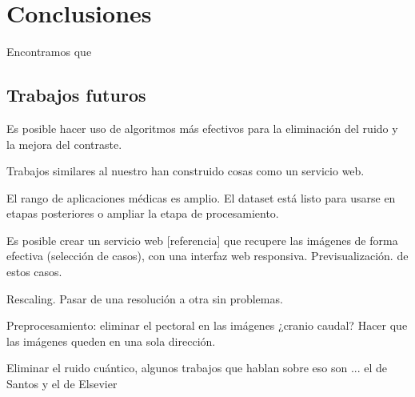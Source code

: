 \chapter{Conclusiones}
\label{conclusiones}

Encontramos que 

\section{Trabajos futuros}

Es posible hacer uso de algoritmos más efectivos para la eliminación del ruido y
la mejora del contraste. 

Trabajos similares al nuestro \cite{heath2000digital} han construido cosas como
un servicio web.

El rango de aplicaciones médicas es amplio. El dataset está listo para usarse
en etapas posteriores o ampliar la etapa de procesamiento.

Es posible crear un servicio web [referencia] que recupere las imágenes de
forma efectiva (selección de casos), con una interfaz web responsiva.
Previsualización. de estos casos.

Rescaling. Pasar de una resolución a otra sin problemas.

Preprocesamiento: eliminar el pectoral en las imágenes ¿cranio caudal?
Hacer que las imágenes queden en una sola dirección.

Eliminar el ruido cuántico, algunos trabajos que hablan sobre eso son ... el de
Santos y el de Elsevier
